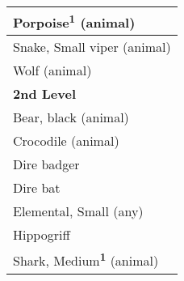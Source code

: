 \begin{longtable}{ll}
{\begin{minipage}[t]{3.857in}
Porpoise\textsuperscript{\textbf{1}}\textbf{} (animal)\end{minipage}}\\
\hline
\multicolumn{2}{|p{3.857in}|}{\begin{minipage}[t]{3.857in}\raggedright
Snake, Small viper (animal)\end{minipage}}\\
\hline
\multicolumn{2}{|p{3.857in}|}{\begin{minipage}[t]{3.857in}\raggedright
Wolf (animal)\end{minipage}}\\
\hline
\multicolumn{2}{|p{3.857in}|}{\begin{minipage}[t]{3.857in}\raggedright
\textbf{2nd Level}\end{minipage}}\\
\hline
\multicolumn{2}{|p{3.857in}|}{\begin{minipage}[t]{3.857in}\raggedright
Bear, black (animal)\end{minipage}}\\
\hline
\multicolumn{2}{|p{3.857in}|}{\begin{minipage}[t]{3.857in}\raggedright
Crocodile (animal)\end{minipage}}\\
\hline
\multicolumn{2}{|p{3.857in}|}{\begin{minipage}[t]{3.857in}\raggedright
Dire badger\end{minipage}}\\
\hline
\multicolumn{2}{|p{3.857in}|}{\begin{minipage}[t]{3.857in}\raggedright
Dire bat\end{minipage}}\\
\hline
\multicolumn{2}{|p{3.857in}|}{\begin{minipage}[t]{3.857in}\raggedright
Elemental, Small (any)\end{minipage}}\\
\hline
\multicolumn{2}{|p{3.857in}|}{\begin{minipage}[t]{3.857in}\raggedright
Hippogriff\end{minipage}}\\
\hline
\multicolumn{2}{|p{3.857in}|}{\begin{minipage}[t]{3.857in}\raggedright
Shark, Medium\textsuperscript{\textbf{1}}\textbf{} (animal)\end{minipage}}\\

\end{longtable}
